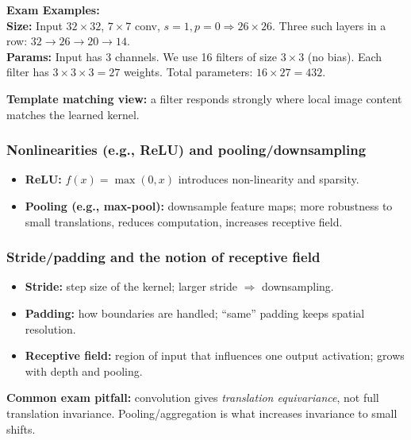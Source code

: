 \documentclass[11pt,a4paper]{article}
\begin{document}
\begin{exbox}
\textbf{Exam Examples:}\\
\textbf{Size:} Input $32\times 32$, $7\times 7$ conv, $s=1, p=0 \Rightarrow 26\times 26$. Three such layers in a row: $32 \to 26 \to 20 \to 14$.\\
\textbf{Params:} Input has 3 channels. We use 16 filters of size $3\times 3$ (no bias). Each filter has $3 \times 3 \times 3 = 27$ weights. Total parameters: $16 \times 27 = 432$.
\end{exbox}

\begin{intbox}
\textbf{Template matching view:} a filter responds strongly where local image content matches the learned kernel.
\end{intbox}

\subsubsection{Nonlinearities (e.g., ReLU) and pooling/downsampling}
\begin{defbox}
\begin{itemize}
  \item \textbf{ReLU:} $f(x)=\max(0,x)$ introduces non-linearity and sparsity.
  \item \textbf{Pooling (e.g., max-pool):} downsample feature maps; more robustness to small translations,
  reduces computation, increases receptive field.
\end{itemize}
\end{defbox}

\subsubsection{Stride/padding and the notion of receptive field}
\begin{itemize}
  \item \textbf{Stride:} step size of the kernel; larger stride $\Rightarrow$ downsampling.
  \item \textbf{Padding:} how boundaries are handled; ``same'' padding keeps spatial resolution.
  \item \textbf{Receptive field:} region of input that influences one output activation; grows with depth and pooling.
\end{itemize}

\begin{qbox}
\textbf{Common exam pitfall:} convolution gives \emph{translation equivariance}, not full translation invariance.
Pooling/aggregation is what increases invariance to small shifts.
\end{qbox}
\end{document}
